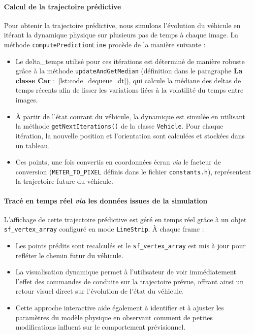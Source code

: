 \paragraph{Calcul de la trajectoire prédictive}
Pour obtenir la trajectoire prédictive, nous simulons l'évolution du véhicule en itérant la dynamique physique sur plusieurs pas de temps à chaque image.
La méthode \texttt{computePredictionLine} procède de la manière suivante :
\begin{itemize}
    \item Le \gls{delta_temps} utilisé pour ces itérations est déterminé de manière robuste grâce à la méthode \texttt{updateAndGetMedian} (définition dans le paragraphe \textbf{La classe Car} :~\ref{lst:code_dequeue_dt}), qui calcule la médiane des deltas de temps récents afin de lisser les variations liées à la volatilité du temps entre images.
    \item À partir de l'état courant du véhicule, la dynamique est simulée en utilisant la méthode \texttt{getNextIterations()} de la classe \texttt{Vehicle}.
    Pour chaque itération, la nouvelle position et l'orientation sont calculées et stockées dans un tableau.
    \item Ces points, une fois convertis en coordonnées écran \textit{via} le facteur de conversion (\texttt{METER\_TO\_PIXEL} définis dans le fichier \texttt{constants.h}), représentent la trajectoire future du véhicule.
\end{itemize}

\paragraph{Tracé en temps réel \textit{via} les données issues de la simulation}
L'affichage de cette trajectoire prédictive est géré en temps réel grâce à un objet \texttt{\gls{sf_vertex_array}}\cite{sfml_sf_vertexarray} configuré en mode \texttt{LineStrip}.
À chaque frame :
\begin{itemize}
    \item Les points prédits sont recalculés et le \texttt{\gls{sf_vertex_array}} est mis à jour pour refléter le chemin futur du véhicule.
    \item La visualisation dynamique permet à l'utilisateur de voir immédiatement l'effet des commandes de conduite sur la trajectoire prévue, offrant ainsi un retour visuel direct sur l'évolution de l'état du véhicule.
    \item Cette approche interactive aide également à identifier et à ajuster les paramètres du modèle physique en observant comment de petites modifications influent sur le comportement prévisionnel.
\end{itemize}

